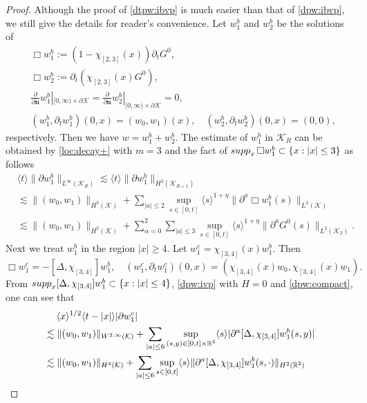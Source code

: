 \documentclass[10pt,a4paper]{amsart}
\def\R{\mathop{\mathbb R\kern 0pt}\nolimits}
\def\bn{\mathbf{n}}
\def\cK{\mathcal K}
\def\ls{\lesssim}
\def\p{\partial}
\def\supp{\mathop{\rm supp}\nolimits}
\newcommand{\w}[1]{\langle {#1} \rangle}
\begin{document}
\begin{proof}
Although the proof of \eqref{dtpw:ibvp} is much easier than that of \eqref{dpw:ibvp},
we still give the details for reader's convenience.
Let $w_1^b$ and $w_2^b$ be the solutions of
\begin{equation*}
\begin{split}
&\Box w_1^b:=(1-\chi_{[2,3]}(x))\p_tG^0,\\
&\Box w_2^b:=\p_t(\chi_{[2,3]}(x)G^0),\\
&\frac{\p}{\p\bn}w_1^b|_{[0,\infty)\times\p\cK}=\frac{\p}{\p\bn}w_2^b|_{[0,\infty)\times\p\cK}=0,\\
&(w_1^b,\p_tw_1^b)(0,x)=(w_0,w_1)(x),\quad (w_2^b,\p_tw_2^b)(0,x)=(0,0),
\end{split}
\end{equation*}
respectively.
Then we have $w=w_1^b+w_2^b$.
The estimate of $w_1^b$ in $\cK_R$ can be obtained by \eqref{loc:decay+} with $m=3$ and the fact of $\supp_x\Box w_1^b\subset\{x:|x|\le3\}$
as follows
\begin{equation}\label{dtpw:pf1}
\begin{split}
&\w{t}\|\p w_1^b\|_{L^\infty(\cK_R)}\ls\w{t}\|\p w_1^b\|_{H^2(\cK_{R+1})}\\
&\ls\|(w_0,w_1)\|_{H^3(\cK)}+\sum_{|a|\le2}\sup_{s\in[0,t]}\w{s}^{1+\eta}\|\p^a\Box w_1^b(s)\|_{L^2(\cK)}\\
&\ls\|(w_0,w_1)\|_{H^3(\cK)}+\sum_{\alpha=0}^2\sum_{|a|\le3}\sup_{s\in[0,t]}\w{s}^{1+\eta}\|\p^aG^0(s)\|_{L^2(\cK_3)}.
\end{split}
\end{equation}
Next we treat $w_1^b$ in the region $|x|\ge4$. Let $w_1^c=\chi_{[3,4]}(x)w_1^b$. Then
\begin{equation*}
\Box w_1^c=-[\Delta,\chi_{[3,4]}]w_1^b,\quad (w_1^c,\p_tw_1^c)(0,x)=(\chi_{[3,4]}(x)w_0,\chi_{[3,4]}(x)w_1).
\end{equation*}
From $\supp_x[\Delta,\chi_{[3,4]}]w_1^b\subset\{x:|x|\le4\}$, \eqref{dpw:ivp} with $H=0$ and \eqref{dpw:compact},
one can see that
\begin{equation}\label{dtpw:pf2}
\begin{split}
&\quad\; \w{x}^{1/2}\w{t-|x|}|\p w_1^c|\\
&\ls\|(w_0,w_1)\|_{W^{2,\infty}(\cK)}+\sum_{|a|\le6}\sup_{(s,y)\in[0,t]\times\R^2}\w{s}|\p^a[\Delta,\chi_{[3,4]}]w_1^b(s,y)|\\
&\ls\|(w_0,w_1)\|_{H^4(\cK)}+\sum_{|a|\le6}\sup_{s\in[0,t]}\w{s}\|\p^a[\Delta,\chi_{[3,4]}]w_1^b(s,\cdot)\|_{H^2(\R^2)}\\

\end{split}
\end{equation}
\end{proof}
\end{document}
